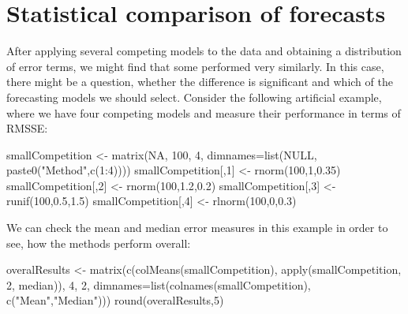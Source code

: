 \documentclass[
]{book}
\newenvironment{Shaded}{\begin{snugshade}}{\end{snugshade}}
\newcommand{\AttributeTok}[1]{\textcolor[rgb]{0.77,0.63,0.00}{#1}}
\newcommand{\ConstantTok}[1]{\textcolor[rgb]{0.00,0.00,0.00}{#1}}
\newcommand{\DecValTok}[1]{\textcolor[rgb]{0.00,0.00,0.81}{#1}}
\newcommand{\FloatTok}[1]{\textcolor[rgb]{0.00,0.00,0.81}{#1}}
\newcommand{\FunctionTok}[1]{\textcolor[rgb]{0.00,0.00,0.00}{#1}}
\newcommand{\NormalTok}[1]{#1}
\newcommand{\OtherTok}[1]{\textcolor[rgb]{0.56,0.35,0.01}{#1}}
\newcommand{\SpecialCharTok}[1]{\textcolor[rgb]{0.00,0.00,0.00}{#1}}
\newcommand{\StringTok}[1]{\textcolor[rgb]{0.31,0.60,0.02}{#1}}
\theoremstyle{definition}
\theoremstyle{definition}
\theoremstyle{definition}
\theoremstyle{definition}
\theoremstyle{remark}
\begin{document}
\hypertarget{statisticalTests}{%
\section{Statistical comparison of forecasts}\label{statisticalTests}}

After applying several competing models to the data and obtaining a distribution of error terms, we might find that some performed very similarly. In this case, there might be a question, whether the difference is significant and which of the forecasting models we should select. Consider the following artificial example, where we have four competing models and measure their performance in terms of RMSSE:

\begin{Shaded}
\begin{Highlighting}[]
\NormalTok{smallCompetition }\OtherTok{\textless{}{-}} \FunctionTok{matrix}\NormalTok{(}\ConstantTok{NA}\NormalTok{, }\DecValTok{100}\NormalTok{, }\DecValTok{4}\NormalTok{,}
                           \AttributeTok{dimnames=}\FunctionTok{list}\NormalTok{(}\ConstantTok{NULL}\NormalTok{,}
                                         \FunctionTok{paste0}\NormalTok{(}\StringTok{"Method"}\NormalTok{,}\FunctionTok{c}\NormalTok{(}\DecValTok{1}\SpecialCharTok{:}\DecValTok{4}\NormalTok{))))}
\NormalTok{smallCompetition[,}\DecValTok{1}\NormalTok{] }\OtherTok{\textless{}{-}} \FunctionTok{rnorm}\NormalTok{(}\DecValTok{100}\NormalTok{,}\DecValTok{1}\NormalTok{,}\FloatTok{0.35}\NormalTok{)}
\NormalTok{smallCompetition[,}\DecValTok{2}\NormalTok{] }\OtherTok{\textless{}{-}} \FunctionTok{rnorm}\NormalTok{(}\DecValTok{100}\NormalTok{,}\FloatTok{1.2}\NormalTok{,}\FloatTok{0.2}\NormalTok{)}
\NormalTok{smallCompetition[,}\DecValTok{3}\NormalTok{] }\OtherTok{\textless{}{-}} \FunctionTok{runif}\NormalTok{(}\DecValTok{100}\NormalTok{,}\FloatTok{0.5}\NormalTok{,}\FloatTok{1.5}\NormalTok{)}
\NormalTok{smallCompetition[,}\DecValTok{4}\NormalTok{] }\OtherTok{\textless{}{-}} \FunctionTok{rlnorm}\NormalTok{(}\DecValTok{100}\NormalTok{,}\DecValTok{0}\NormalTok{,}\FloatTok{0.3}\NormalTok{)}
\end{Highlighting}
\end{Shaded}

We can check the mean and median error measures in this example in order to see, how the methods perform overall:

\begin{Shaded}
\begin{Highlighting}[]
\NormalTok{overalResults }\OtherTok{\textless{}{-}}
  \FunctionTok{matrix}\NormalTok{(}\FunctionTok{c}\NormalTok{(}\FunctionTok{colMeans}\NormalTok{(smallCompetition), }
           \FunctionTok{apply}\NormalTok{(smallCompetition, }\DecValTok{2}\NormalTok{, median)),}
         \DecValTok{4}\NormalTok{, }\DecValTok{2}\NormalTok{, }\AttributeTok{dimnames=}\FunctionTok{list}\NormalTok{(}\FunctionTok{colnames}\NormalTok{(smallCompetition),}
                             \FunctionTok{c}\NormalTok{(}\StringTok{"Mean"}\NormalTok{,}\StringTok{"Median"}\NormalTok{)))}
\FunctionTok{round}\NormalTok{(overalResults,}\DecValTok{5}\NormalTok{)}
\end{Highlighting}
\end{Shaded}
\end{document}
